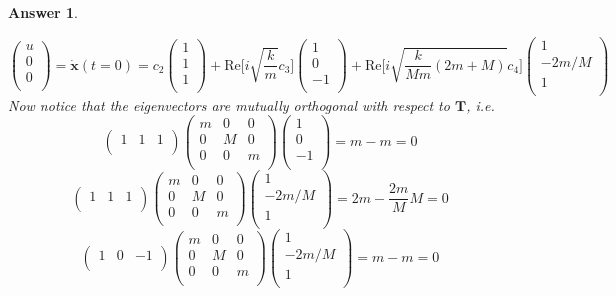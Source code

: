 \documentclass[a4paper]{article}
\newtheorem{ans}{Answer}[section]
\theoremstyle{new}
\begin{document}
\begin{ans}
\begin{enumerate}[label=(\roman*)]
$$\begin{pmatrix}u\\0\\0\\\end{pmatrix}=\mathbf{\dot{x}}(t=0)=c_2\begin{pmatrix}1\\1\\1\\\end{pmatrix}+\text{Re}\bigg[i\sqrt{\frac{k}{m}}c_3\bigg]\begin{pmatrix}1\\0\\-1\\\end{pmatrix}+\text{Re}\bigg[i\sqrt{\frac{k}{Mm}(2m+M)}c_4\bigg]\begin{pmatrix}1\\-2m/M\\1\\\end{pmatrix}$$
Now notice that the eigenvectors are mutually orthogonal with respect to $\mathbf{T}$, i.e.
$$\begin{pmatrix}1&1&1\\\end{pmatrix}\begin{pmatrix}m&0&0\\0&M&0\\0&0&m\\\end{pmatrix}\begin{pmatrix}1\\0\\-1\\\end{pmatrix}=m-m=0$$ $$\begin{pmatrix}1&1&1\\\end{pmatrix}\begin{pmatrix}m&0&0\\0&M&0\\0&0&m\\\end{pmatrix}\begin{pmatrix}1\\-2m/M\\1\\\end{pmatrix}=2m-\frac{2m}{M}M=0$$
$$\begin{pmatrix}1&0&-1\\\end{pmatrix}\begin{pmatrix}m&0&0\\0&M&0\\0&0&m\\\end{pmatrix}\begin{pmatrix}1\\-2m/M\\1\\\end{pmatrix}=m-m=0$$

\end{enumerate}
\end{ans}
\end{document}
